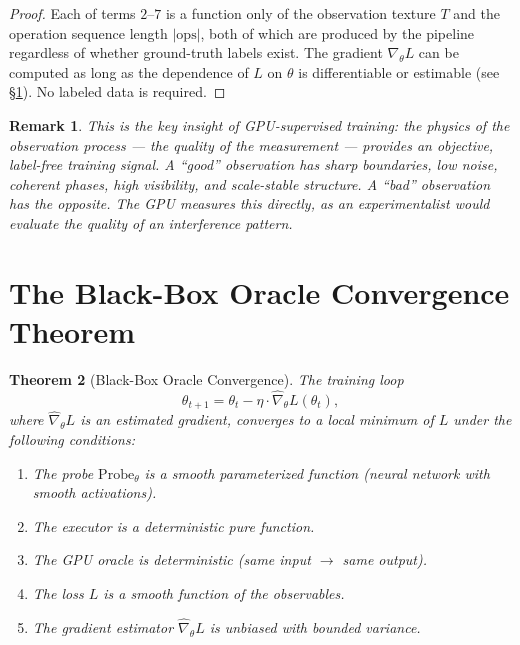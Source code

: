 \documentclass[11pt,twocolumn,a4paper]{article}
\newtheorem{theorem}{Theorem}[section]
\newtheorem{remark}[theorem]{Remark}
\begin{document}
\begin{proof}
Each of terms $2$--$7$ is a function only of the observation texture
$T$ and the operation sequence length $|\text{ops}|$, both of which
are produced by the pipeline regardless of whether ground-truth labels
exist. The gradient $\nabla_\theta L$ can be computed as long as the
dependence of $L$ on $\theta$ is differentiable or estimable (see
\S\ref{sec:convergence}). No labeled data is required. \qedhere
\end{proof}

\begin{remark}
This is the key insight of GPU-supervised training: the physics of
the observation process --- the quality of the measurement --- provides
an objective, label-free training signal. A ``good'' observation has
sharp boundaries, low noise, coherent phases, high visibility, and
scale-stable structure. A ``bad'' observation has the opposite. The
GPU measures this directly, as an experimentalist would evaluate the
quality of an interference pattern.
\end{remark}


\section{The Black-Box Oracle Convergence Theorem}
\label{sec:convergence}

\begin{theorem}[Black-Box Oracle Convergence]
\label{thm:convergence}
The training loop
\begin{equation}
\theta_{t+1} = \theta_t
  - \eta \cdot \hat{\nabla}_\theta L(\theta_t),
\label{eq:update}
\end{equation}
where $\hat{\nabla}_\theta L$ is an estimated gradient, converges to
a local minimum of $L$ under the following conditions:
\begin{enumerate}[label=(\roman*),leftmargin=*]
\item The probe $\mathrm{Probe}_\theta$ is a smooth parameterized
  function (neural network with smooth activations).
\item The executor is a deterministic pure function.
\item The GPU oracle is deterministic (same input $\to$ same output).
\item The loss $L$ is a smooth function of the observables.
\item The gradient estimator $\hat{\nabla}_\theta L$ is unbiased
  with bounded variance.
\end{enumerate}
\end{theorem}
\end{document}
